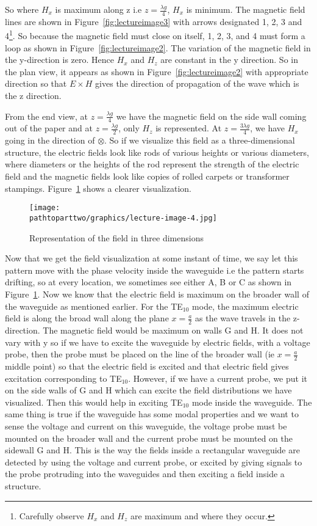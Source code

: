 So where $H_{x}$ is maximum along z i.e  $z=\frac{\lambda g}{4}$, $H_{x}$ is minimum. The magnetic field lines are shown in Figure~\ref{fig:lectureimage3} with arrows designated 1, 2, 3 and 4\footnote{
Carefully observe $H_{x}$ and $H_{z}$ are maximum and where they occur.
}. So because the magnetic field must close on itself, 1, 2, 3, and 4 must form a loop as shown in Figure~\ref{fig:lectureimage2}. The variation of the magnetic field in the y-direction is zero. Hence $H_{x}$ and $H_{z}$ are constant in the y direction. So in the plan view, it appears as shown in Figure~\ref{fig:lectureimage2} with appropriate direction so that $E\times H$ gives the direction of propagation of the wave which is the z direction.

From the end view, at $z=\frac{\lambda g}{4}$ we have the magnetic field on the side wall coming out of the paper and at $z=\frac{\lambda g}{2}$, only $H_{z}$ is represented. At $z=\frac{3\lambda g}{4}$, we have $H_{x}$ going in the direction of $\otimes$. So if we visualize this field as a three-dimensional structure, the electric fields look like rods of various heights or various diameters, where diameters or the heights of the rod represent the strength of the electric field and the magnetic fields look like copies of rolled carpets or transformer stampings. Figure~\ref{fig:lectureimage4} shows a clearer visualization.
\begin{figure}[h]
\centering
\texttt{[image: \\pathtoparttwo/graphics/lecture-image-4.jpg]}
\caption{Representation of the field in three dimensions}
\label{fig:lectureimage4}
\end{figure}

Now that we get the field visualization at some instant of time, we say let this pattern move with the phase velocity inside the waveguide i.e the pattern starts drifting, so at every location, we sometimes see either A, B or C as shown in Figure~\ref{fig:lectureimage4}. Now we know that the electric field is maximum on the broader wall of the waveguide as mentioned earlier. For the TE$_{10}$ mode, the maximum electric field is along the broad wall along the plane $x = \frac{a}{2}$ as the wave travels in the z-direction. The magnetic field would be maximum on walls G and H. It does not vary with y so if we have to excite the waveguide by electric fields, with a voltage probe, then the probe must be placed on the line of the broader wall (ie $x = \frac{a}{2}$ middle point) so that the electric field is excited and that electric field gives excitation corresponding to TE$_{10}$. However, if we have a current probe, we put it on the side walls of G and H which can excite the field distributions we have visualized. Then this would help in exciting TE$_{10}$ mode inside the waveguide. The same thing is true if the waveguide has some modal properties and we want to sense the voltage and current on this waveguide, the voltage probe must be mounted on the broader wall and the current probe must be mounted on the sidewall G and H. This is the way the fields inside a rectangular waveguide are detected by using the voltage and current probe, or excited by giving signals to the probe protruding into the waveguides and then exciting a field inside a structure.

